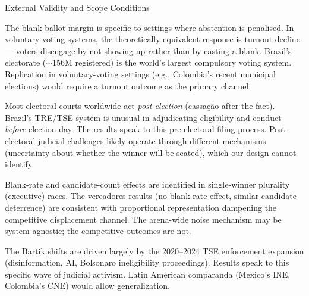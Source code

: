 \documentclass[aspectratio=169,10pt]{beamer}
\begin{document}
\begin{frame}{External Validity and Scope Conditions}
\begin{description}\itemsep10pt
  \item[\textbf{Compulsory voting}]
    The blank-ballot margin is specific to settings where abstention is penalised. In voluntary-voting systems, the theoretically equivalent response is turnout decline --- voters disengage by not showing up rather than by casting a blank. Brazil's electorate ($\sim$156M registered) is the world's largest compulsory voting system. Replication in voluntary-voting settings (e.g., Colombia's recent municipal elections) would require a turnout outcome as the primary channel.

  \item[\textbf{Pre-election first-instance jurisdiction}]
    Most electoral courts worldwide act \emph{post-election} (cassação after the fact). Brazil's TRE/TSE system is unusual in adjudicating eligibility and conduct \emph{before} election day. The results speak to this pre-electoral filing process. Post-electoral judicial challenges likely operate through different mechanisms (uncertainty about whether the winner will be seated), which our design cannot identify.

  \item[\textbf{Electoral system}]
    Blank-rate and candidate-count effects are identified in single-winner plurality (executive) races. The vereadores results (no blank-rate effect, similar candidate deterrence) are consistent with proportional representation dampening the competitive displacement channel. The arena-wide noise mechanism may be system-agnostic; the competitive outcomes are not.

  \item[\textbf{Institutional wave}]
    The Bartik shifts are driven largely by the 2020--2024 TSE enforcement expansion (disinformation, AI, Bolsonaro ineligibility proceedings). Results speak to this specific wave of judicial activism. Latin American comparanda (Mexico's INE, Colombia's CNE) would allow generalization.
\end{description}
\end{frame}
\end{document}
